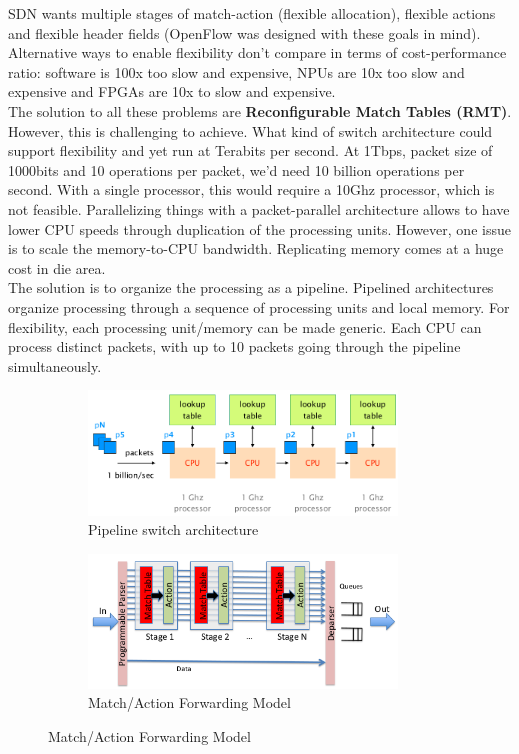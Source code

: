 \documentclass[11pt,oneside,a4paper]{article}
\begin{document}
\noindent SDN wants multiple stages of match-action (flexible allocation), flexible actions and flexible header fields (OpenFlow was designed with these goals in mind). Alternative ways to enable flexibility don't compare in terms of cost-performance ratio: software is 100x too slow and expensive, NPUs are 10x too slow and expensive and FPGAs are 10x to slow and expensive.\\

The solution to all these problems are \textbf{Reconfigurable Match Tables (RMT)}. However, this is challenging to achieve. What kind of switch architecture could support flexibility and yet run at Terabits per second.  At 1Tbps, packet size of 1000bits and 10 operations per packet, we'd need 10 billion operations per second. With a single processor, this would require a 10Ghz processor, which is not feasible. Parallelizing things with a packet-parallel architecture allows to have lower CPU speeds through duplication of the processing units. However, one issue is to scale the memory-to-CPU bandwidth. Replicating memory comes at a huge cost in die area.\\
\noindent The solution is to organize the processing as a pipeline. Pipelined architectures organize processing through a sequence of processing units and local memory. For flexibility, each processing unit/memory can be made generic. Each CPU can process distinct packets, with up to 10 packets going through the pipeline simultaneously.

\begin{figure}[hb]
	\centering
	\begin{subfigure}[t]{.5\textwidth}
		\centering
		\includegraphics[width=0.9\textwidth,scale=1]{figures/switch_pipeline}
		\caption{Pipeline switch architecture}
		\label{fig:switch_pipeline}
	\end{subfigure}%
	\begin{subfigure}[t]{.5\textwidth}
		\centering
		\includegraphics[width=0.9\textwidth,scale=1]{figures/matchaction_forwarding_model}
		\caption{Match/Action Forwarding Model}
		\label{fig:matchaction_forwarding_model}
	\end{subfigure}
\end{figure}
\end{document}
